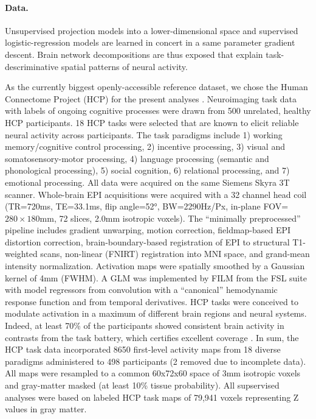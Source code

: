 \documentclass{article} %
\begin{document}
\paragraph{Data.}
Unsupervised projection models into a lower-dimensional space and
supervised logistic-regression models are learned in concert
in a same parameter gradient descent.
Brain
network decompositions are thus exposed that explain task-descriminative spatial
patterns of neural activity.

As the currently biggest openly-accessible reference dataset,
we chose the Human Connectome Project (HCP) for the present analyses
\cite{barch2013}.
Neuroimaging task data with labels of ongoing cognitive processes
were drawn from 500 unrelated,
healthy HCP participants.
18 HCP tasks 
were selected that are known to elicit reliable neural activity
across participants.
The task paradigms include
1) working memory/cognitive control processing, 2)
incentive processing, 3) visual and somatosensory-motor processing,
4) language processing (semantic and phonological processing),
5) social cognition, 6) relational processing, and 7) emotional
processing. All data were acquired on the same Siemens Skyra 3T scanner.
Whole-brain EPI acquisitions were acquired with a
32 channel head coil (TR=720ms, TE=33.1ms, flip angle=52°, BW=2290Hz/Px,
in-plane FOV=$280\times180$mm, 72 slices, 2.0mm isotropic voxels).
The “minimally preprocessed” pipeline includes
gradient unwarping, motion correction, fieldmap-based EPI distortion
correction, brain-boundary-based registration of EPI to structural
T1-weighted scans, non-linear (FNIRT) registration into MNI space,
and grand-mean intensity normalization. Activation maps were spatially
smoothed by a Gaussian kernel of 4mm (FWHM). A GLM was
implemented by FILM from the FSL suite with model regressors from convolution
with a “canonical” hemodynamic response function and from temporal derivatives.
HCP tasks were conceived to modulate activation
in a maximum of different brain regions and neural systems. Indeed, at
least 70\% of the participants showed consistent brain activity in
contrasts from the task battery, which certifies excellent
coverage \cite{barch2013}.
In sum, the HCP task data incorporated 8650 first-level activity maps
from 18 diverse paradigms administered to 498 participants (2 removed
due to incomplete data).
All maps were resampled to a common 60x72x60 space of
3mm isotropic voxels and gray-matter masked (at least 10\% tissue
probability).
All supservised analyses were based on labeled HCP task maps of
79,941 voxels representing Z values in gray matter.
\end{document}
